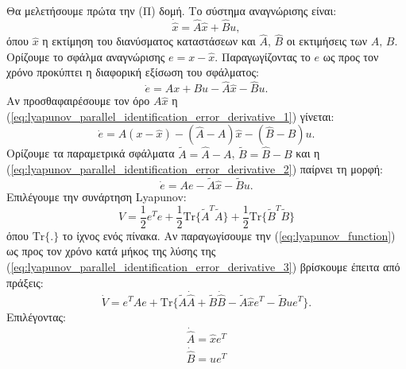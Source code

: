 \documentclass[a4paper,12pt]{article}
\begin{document}
Θα μελετήσουμε πρώτα την (Π) δομή. Το σύστημα αναγνώρισης είναι:
\begin{equation}
    \dot{\hat{x}} = \hat{A}\hat{x} + \hat{B} u,
    \label{eq:lyapunov_parallel_identification_system}
\end{equation}
όπου $\hat{x}$ η εκτίμηση του διανύσματος καταστάσεων και $\hat{A}, \, \hat{B}$ οι εκτιμήσεις των $A, \, B$.
Ορίζουμε το σφάλμα αναγνώρισης $e = x - \hat{x}$. Παραγωγίζοντας το $e$ ως προς τον χρόνο προκύπτει η διαφορική
εξίσωση του σφάλματος:
\begin{equation}
    \dot{e} = Ax + Bu - \hat{A}\hat{x} - \hat{B}u.
    \label{eq:lyapunov_parallel_identification_error_derivative_1}
\end{equation}
Αν προσθαφαιρέσουμε τον όρο $A\hat{x}$ η (\ref{eq:lyapunov_parallel_identification_error_derivative_1}) γίνεται:
\begin{equation}
    \dot{e} = A(x - \hat{x}) - (\hat{A} - A)\hat{x} - (\hat{B} - B)u.
    \label{eq:lyapunov_parallel_identification_error_derivative_2}
\end{equation}
Ορίζουμε τα παραμετρικά σφάλματα $\tilde{A} = \hat{A} - A$, $\tilde{B} = \hat{B} - B$ και η 
(\ref{eq:lyapunov_parallel_identification_error_derivative_2}) παίρνει τη μορφή:
\begin{equation}
    \dot{e} = Ae -\tilde{A}\hat{x} - \tilde{B}u.
    \label{eq:lyapunov_parallel_identification_error_derivative_3}
\end{equation}
Επιλέγουμε την συνάρτηση Lyapunov:
\begin{equation}
    V = \frac{1}{2}e^Te + \frac{1}{2}\mathrm{Tr}\{\tilde{A}^T\tilde{A}\} + 
    \frac{1}{2}\mathrm{Tr}\{\tilde{B}^T\tilde{B}\}
    \label{eq:lyapunov_function}
\end{equation}
όπου $\mathrm{Tr\{.\}}$ το ίχνος ενός πίνακα. Αν παραγωγίσουμε την (\ref{eq:lyapunov_function}) ως προς τον
χρόνο κατά μήκος της λύσης της (\ref{eq:lyapunov_parallel_identification_error_derivative_3}) βρίσκουμε έπειτα
από πράξεις:
\begin{equation}
    \dot{V} = e^TAe + \mathrm{Tr}\{\tilde{A}\dot{\hat{A}} + \tilde{B}\dot{\hat{B}} - 
    \tilde{A}\hat{x}e^T - \tilde{B}ue^T\}.
    \label{eq:lyapunov_parallel_function_derivative_1}
\end{equation}
Επιλέγοντας:
\begin{equation}
    \begin{aligned}
        \dot{\hat{A}} = \hat{x}e^T \\ 
        \dot{\hat{B}} = ue^T
    \end{aligned}
    \label{eq:lyapunov_parallel_update_formula}
\end{equation}
\end{document}
